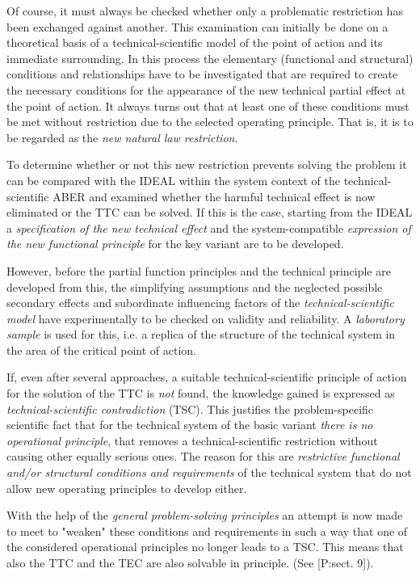 \documentclass[11pt,a4paper]{article}
\begin{document}
Of course, it must always be checked whether only a problematic restriction
has been exchanged against another. This examination can initially be done on
a theoretical basis of a technical-scientific model of the point of action and
its immediate surrounding.  In this process the elementary (functional and
structural) conditions and relationships have to be investigated that are
required to create the necessary conditions for the appearance of the new
technical partial effect at the point of action. It always turns out that at
least one of these conditions must be met without restriction due to the
selected operating principle. That is, it is to be regarded as the \emph{new
  natural law restriction}.

To determine whether or not this new restriction prevents solving the problem
it can be compared with the IDEAL within the system context of the
technical-scientific ABER and examined whether the harmful technical effect is
now eliminated or the TTC can be solved.  If this is the case, starting from
the IDEAL a \emph{specification of the new technical effect} and the
system-compatible \emph{expression of the new functional principle} for the
key variant are to be developed.

However, before the partial function principles and the technical principle
are developed from this, the simplifying assumptions and the neglected
possible secondary effects and subordinate influencing factors of the
\emph{technical-scientific model} have experimentally to be checked on
validity and reliability.  A \emph{laboratory sample} is used for this, i.e. a
replica of the structure of the technical system in the area of the critical
point of action.

If, even after several approaches, a suitable technical-scientific principle
of action for the solution of the TTC is \emph{not} found, the knowledge
gained is expressed as \emph{technical-scientific contradiction} (TSC). This
justifies the problem-specific scientific fact that for the technical system
of the basic variant \emph{there is no operational principle}, that removes a
technical-scientific restriction without causing other equally serious ones.
The reason for this are \emph{restrictive functional and/or structural
  conditions and requirements} of the technical system that do not allow new
operating principles to develop either.

With the help of the \emph{general problem-solving principles} an attempt is
now made to meet to "weaken" these conditions and requirements in such a way
that one of the considered operational principles no longer leads to a TSC.
This means that also the TTC and the TEC are also solvable in principle. (See
[P:sect. 9]). 
\end{document}
